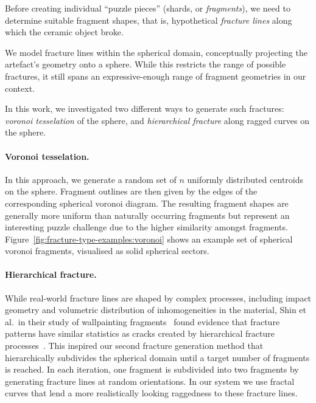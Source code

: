 \documentclass[acmlarge,screen,dvipsnames]{acmart}
\begin{document}
Before creating individual ``puzzle pieces'' (shards,
or \emph{fragments}), we need to determine suitable fragment shapes, that
is, hypothetical \emph{fracture lines} along which the ceramic object broke.

We model fracture lines within the spherical domain, conceptually
projecting the artefact's geometry onto a sphere. While this restricts the
range of possible fractures, it still spans an expressive-enough range
of fragment geometries in our context.

In this work, we investigated two different ways to generate such
fractures: \emph{voronoi tesselation} of the sphere, and
\emph{hierarchical fracture} along ragged curves on the sphere.

\paragraph{Voronoi tesselation.}
%
In this approach, we generate a random set of $n$ uniformly
distributed centroids on the sphere. Fragment outlines are then given
by the edges of the corresponding spherical voronoi diagram.
%
The resulting fragment shapes are generally more uniform than
naturally occurring fragments but represent an interesting
puzzle challenge due to the higher similarity amongst fragments.
%
Figure~\ref{fig:fracture-type-examples:voronoi} shows an example set
of spherical voronoi fragments, visualised as solid spherical sectors.

\paragraph{Hierarchical fracture.}
%
While real-world fracture lines are shaped by complex processes,
including impact geometry and volumetric distribution of
inhomogeneities in the material, Shin et al.\ in their study of
wallpainting fragments~\cite{Shin:2012:ASF:2362402.2362404} found
evidence that fracture patterns have similar statistics as cracks
created by hierarchical fracture
processes~\cite{Bohn:2005:Four}.
%
This inspired our second fracture generation method that
hierarchically subdivides the spherical domain until a target number
of fragments is reached. In each iteration, one fragment is subdivided into 
two fragments by generating fracture lines at random orientations. 
%
In our system we use fractal curves that lend a more realistically
looking raggedness to these fracture lines.
\end{document}
